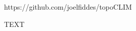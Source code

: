 \documentclass[hess, manuscript]{copernicus}
\begin{document}
https://github.com/joelfiddes/topoCLIM
















\begin{acknowledgements}
TEXT
\end{acknowledgements}
\end{document}
